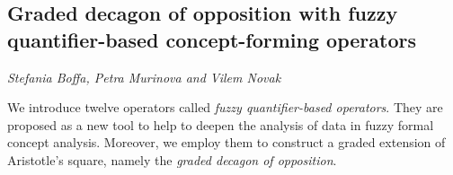 \documentclass[../booklet.tex]{subfiles}
\begin{document}
\subsection[Graded decagon of opposition with fuzzy quantifier-based concept-forming operators. {\it Stefania Boffa, Petra Murinova and Vilem Novak}]{Graded decagon of opposition with fuzzy quantifier-based concept-forming operators}
  

\begin{center}
  {\it Stefania Boffa, Petra Murinova and Vilem Novak}
\end{center}

\vskip 0.8cm


We introduce twelve operators called \emph{fuzzy quantifier-based operators}. They are proposed as a new tool to help to deepen the analysis of data in fuzzy formal concept analysis. 
 Moreover, we employ them to construct a graded extension of Aristotle's square, namely the \emph{graded decagon of opposition}.
%
\end{document}
